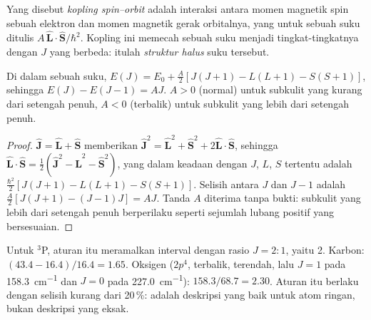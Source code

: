 \begin{definition}\label{def:b3:many-electron-atoms:spin-orbit}
Yang disebut \emph{kopling spin--orbit} adalah
interaksi antara momen magnetik spin sebuah elektron dan momen magnetik gerak
orbitalnya, yang untuk sebuah suku ditulis $A\,\hat{\mathbf L}\cdot\hat{\mathbf S}/\hbar^2$.
Kopling ini memecah sebuah suku menjadi tingkat-tingkatnya dengan $J$ yang
berbeda: itulah \emph{struktur halus} suku tersebut.
\end{definition}

\begin{proposition}\label{prop:b3:many-electron-atoms:lande}
Di dalam sebuah suku, $E(J) = E_0 + \frac{A}{2}[J(J+1) - L(L+1) - S(S+1)]$,
sehingga $E(J) - E(J - 1) = AJ$. $A > 0$ (normal) untuk subkulit yang kurang
dari setengah penuh, $A < 0$ (terbalik) untuk subkulit yang lebih dari
setengah penuh.
\end{proposition}

\begin{proof}
$\hat{\mathbf J} = \hat{\mathbf L} + \hat{\mathbf S}$ memberikan $\hat{\mathbf J}^2 =
\hat{\mathbf L}^2 + \hat{\mathbf S}^2 + 2\hat{\mathbf L}\cdot\hat{\mathbf S}$, sehingga
$\hat{\mathbf L}\cdot\hat{\mathbf S} = \frac12(\hat{\mathbf J}^2 - \hat{\mathbf L}^2 -
\hat{\mathbf S}^2)$, yang  dalam keadaan dengan $J$, $L$, $S$
tertentu adalah $\frac{\hbar^2}{2}[J(J+1) - L(L+1) - S(S+1)]$. Selisih antara
$J$ dan $J - 1$ adalah $\frac A2[J(J+1) - (J-1)J] = AJ$. Tanda $A$ diterima
tanpa bukti: subkulit yang lebih dari setengah penuh berperilaku seperti
sejumlah lubang positif yang bersesuaian.
\end{proof}

\begin{example}\label{ex:b3:many-electron-atoms:lande-test}
Untuk ${}^3$P, aturan itu meramalkan interval dengan rasio $J = 2 : 1$, yaitu 2.
Karbon: $(43.4 - 16.4)/16.4 = 1.65$. Oksigen ($2p^4$, terbalik, 
terendah, lalu $J = 1$ pada \qty{158.3}{cm^{-1}} dan $J = 0$ pada
\qty{227.0}{cm^{-1}}): $158.3/68.7 = 2.30$. Aturan itu berlaku dengan selisih
kurang dari 20\,\%:  adalah deskripsi yang baik untuk
atom ringan, bukan deskripsi yang eksak.
\end{example}

